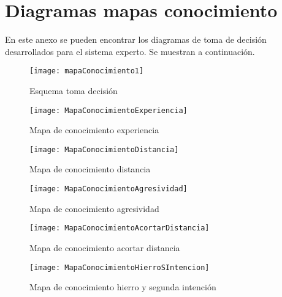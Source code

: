 \chapter{Diagramas mapas conocimiento}
\label{cap:Diagramas mapas conocimiento}

En este anexo se pueden encontrar los diagramas de toma de decisión desarrollados para el sistema
experto. Se muestran a continuación.

\begin{figure}[htb]
  \centering
    \texttt{[image: mapaConocimiento1]}
  \caption[Esquema toma decisión]{Esquema toma decisión}
  \label{fig:Esquema toma decisión anexo}
\end{figure}

\begin{figure}[htb]
  \centering
    \texttt{[image: MapaConocimientoExperiencia]}
  \caption[Mapa de conocimiento experiencia]{Mapa de conocimiento experiencia}
  \label{fig:Arbol decisión experiencia anexo}
\end{figure}

\begin{figure}[htb]
  \centering
    \texttt{[image: MapaConocimientoDistancia]}
  \caption[Mapa de conocimiento distancia]{Mapa de conocimiento distancia}
  \label{fig:Arbol decisión distancia anexo}
\end{figure}


\begin{figure}[htb]
  \centering
    \texttt{[image: MapaConocimientoAgresividad]}
  \caption[Mapa de conocimiento agresividad]{Mapa de conocimiento agresividad}
  \label{fig:Arbol decisión agresividad anexo}
\end{figure}


\begin{figure}[htb]
  \centering
    \texttt{[image: MapaConocimientoAcortarDistancia]}
  \caption[Mapa de conocimiento acortar distancia]{Mapa de conocimiento acortar distancia}
  \label{fig:Arbol decisión acortar distancia anexo}
\end{figure}


\begin{figure}[htb]
  \centering
    \texttt{[image: MapaConocimientoHierroSIntencion]}
  \caption[Mapa de conocimiento hierro y segunda intención]{Mapa de conocimiento hierro y segunda intención}
  \label{fig:Arbol decisión hierro y segunda intención anexo}
\end{figure}
